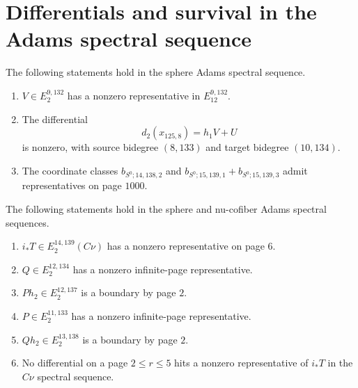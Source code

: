 \section{Differentials and survival in the Adams spectral sequence}

\begin{theorem}
\label{frontier:AdamsCalculations:e95db202825f}
The following statements hold in the sphere Adams spectral sequence.
\begin{enumerate}
\item $V\in E_2^{9,132}$ has a nonzero representative in $E_{12}^{9,132}$.
\item The differential
\[d_2(x_{125,8})=h_1V+U\]
is nonzero, with source bidegree $(8,133)$ and target bidegree $(10,134)$.
\item The coordinate classes $b_{S^0;14,138,2}$ and $b_{S^0;15,139,1}+b_{S^0;15,139,3}$ admit representatives on page $1000$.
\end{enumerate}
\end{theorem}

\begin{theorem}
\label{frontier:AdamsCalculations:7621dd387a1a}
The following statements hold in the sphere and nu-cofiber Adams spectral sequences.
\begin{enumerate}
\item $i_*T\in E_2^{14,139}(C\nu)$ has a nonzero representative on page $6$.
\item $Q\in E_2^{12,134}$ has a nonzero infinite-page representative.
\item $Ph_2\in E_2^{12,137}$ is a boundary by page $2$.
\item $P\in E_2^{11,133}$ has a nonzero infinite-page representative.
\item $Qh_2\in E_2^{13,138}$ is a boundary by page $2$.
\item No differential on a page $2\leq r\leq5$ hits a nonzero representative of $i_*T$ in the $C\nu$ spectral sequence.
\end{enumerate}
\end{theorem}

